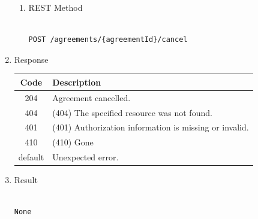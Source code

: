 \begin{enumerate}
\begin{enumerate}
\item REST Method

\begin{tcolorbox}[boxrule=0pt, frame empty]
\begin{verbatim} 

POST /agreements/{agreementId}/cancel

\end{verbatim}
\end{tcolorbox}

\end{enumerate}

\item Response

\begin{center}
\begin{tabular}{|c|l|} 
\hline
\rowcolor{lightgray}	Code 		& 	Description \\
\hline
204	 		&	Agreement cancelled. \\
\hline
404			&	(404) The specified resource was not found. \\
\hline
401			&	(401) Authorization information is missing or invalid. \\
\hline
410			&	(410) Gone \\
\hline
default		&	Unexpected error. \\
\hline
\end{tabular}
\end{center}

\item Result

\begin{tcolorbox}[boxrule=0pt, frame empty]
\begin{verbatim}

None

\end{verbatim}
\end{tcolorbox}



\end{enumerate}
